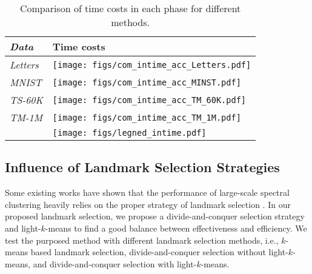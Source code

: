 \begin{table}\centering
  \caption{Comparison of time costs in each phase for different methods.}
  \label{table:compare_intime}
  \begin{threeparttable}
    \begin{tabular}{m{0.8cm}<{\centering}|m{6cm}<{\centering}}
      \toprule
      \emph{Data} & Time costs                                                   \\

      \midrule
      \multirow{1}{*}{\emph{Letters}}
                  & \texttt{[image: figs/com\_intime\_acc\_Letters.pdf]} \\
      \emph{MNIST}
                  & \texttt{[image: figs/com\_intime\_acc\_MINST.pdf]}   \\
      \emph{TS-60K}
                  & \texttt{[image: figs/com\_intime\_acc\_TM\_60K.pdf]}  \\
      \emph{TM-1M}
                  & \texttt{[image: figs/com\_intime\_acc\_TM\_1M.pdf]}   \\
                  & {\texttt{[image: figs/legned\_intime.pdf]}}        \\
      \bottomrule
    \end{tabular}
  \end{threeparttable}
\end{table}


\subsection{Influence of Landmark Selection Strategies}
\label{sec:cmpSelStrat}

Some existing works have shown that the performance of large-scale spectral clustering heavily relies on the proper strategy of landmark selection \cite{li2020hubness}.
In our proposed landmark selection, we propose a divide-and-conquer selection strategy and light-$k$-means to find a good balance between effectiveness and efficiency.
We test the purposed method with different landmark selection methods, i.e., $k$-means based landmark selection, divide-and-conquer selection without light-$k$-means, and divide-and-conquer selection with light-$k$-means.

